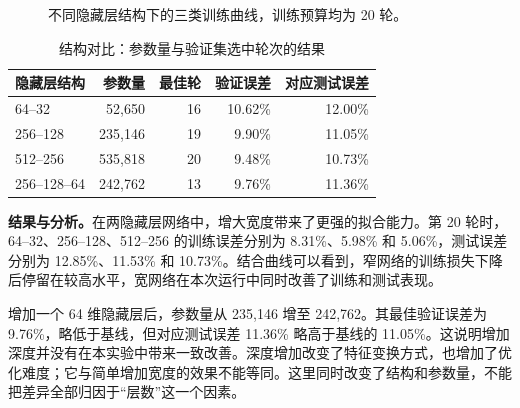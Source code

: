 \documentclass[UTF8,11pt,a4paper,fontset=fandol]{ctexart}
\begin{document}
\begin{figure}[H]
\caption{不同隐藏层结构下的三类训练曲线，训练预算均为 20 轮。}\label{fig:structure}
\end{figure}
\begin{table}[H]\centering\small
\caption{结构对比：参数量与验证集选中轮次的结果}
\begin{tabular}{lrrrr}\toprule
隐藏层结构 & 参数量 & 最佳轮 & 验证误差 & 对应测试误差 \\\midrule
64--32 & 52,650 & 16 & 10.62\% & 12.00\% \\
256--128 & 235,146 & 19 & 9.90\% & 11.05\% \\
512--256 & 535,818 & 20 & 9.48\% & 10.73\% \\
256--128--64 & 242,762 & 13 & 9.76\% & 11.36\% \\

\bottomrule\end{tabular}
\end{table}
\textbf{结果与分析。}在两隐藏层网络中，增大宽度带来了更强的拟合能力。第 20 轮时，64--32、256--128、512--256 的训练误差分别为 8.31\%、5.98\% 和 5.06\%，测试误差分别为 12.85\%、11.53\% 和 10.73\%。结合曲线可以看到，窄网络的训练损失下降后停留在较高水平，宽网络在本次运行中同时改善了训练和测试表现。

增加一个 64 维隐藏层后，参数量从 235,146 增至 242,762。其最佳验证误差为 9.76\%，略低于基线，但对应测试误差 11.36\% 略高于基线的 11.05\%。这说明增加深度并没有在本实验中带来一致改善。深度增加改变了特征变换方式，也增加了优化难度；它与简单增加宽度的效果不能等同。这里同时改变了结构和参数量，不能把差异全部归因于“层数”这一个因素。
\end{document}
